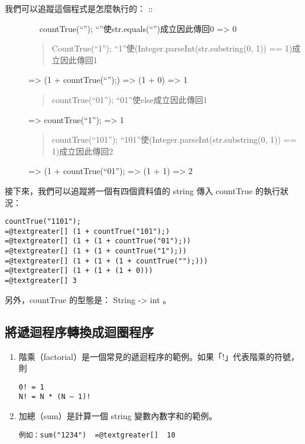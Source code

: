 \documentclass[a4paper,12pt,english]{sphinxmanual}
\begin{document}
\begin{description}
\item[{我們可以追蹤這個程式是怎麼執行的： ::}] \leavevmode
　 countTrue(``'');         ``''使str.equals(``'')成立因此傳回0
=\textgreater{} 0
\begin{quote}

CountTrue(``1'');        ``1''使(Integer.parseInt(str.substring(0, 1)) == 1)成立因此傳回1
\end{quote}

=\textgreater{} (1 + countTrue(``'');)
=\textgreater{} (1 + 0)
=\textgreater{} 1
\begin{quote}

countTrue(``01'');       ``01''使else成立因此傳回1
\end{quote}

=\textgreater{} countTrue(``1'');
=\textgreater{} 1
\begin{quote}

countTrue(``101'');      ``101''使(Integer.parseInt(str.substring(0, 1)) == 1)成立因此傳回2
\end{quote}

=\textgreater{} (1 + countTrue(``01'');
=\textgreater{} (1 + 1)
=\textgreater{} 2

\end{description}

接下來，我們可以追蹤將一個有四個資料值的 string 傳入 countTrue 的執行狀況：

\begin{Verbatim}[commandchars=@\[\]]
   countTrue("1101");
=@textgreater[] (1 + countTrue("101");)
=@textgreater[] (1 + (1 + countTrue("01");))
=@textgreater[] (1 + (1 + countTrue("1");))
=@textgreater[] (1 + (1 + (1 + countTrue("");)))
=@textgreater[] (1 + (1 + (1 + 0)))
=@textgreater[] 3
\end{Verbatim}

另外，countTrue 的型態是： String -\textgreater{} int 。


\subsection{將遞迴程序轉換成迴圈程序}
\label{java_loop:id7}\begin{enumerate}
\item {} 
階乘（factorial）是一個常見的遞迴程序的範例。如果「!」代表階乘的符號，則

\begin{Verbatim}[commandchars=@\[\]]
0! = 1
N! = N * (N – 1)!
\end{Verbatim}

\item {} 
加總（sum）是計算一個 string 變數內數字和的範例。

\begin{Verbatim}[commandchars=@\[\]]
例如：sum("1234")  =@textgreater[]  10
\end{Verbatim}

\end{enumerate}
\end{document}

